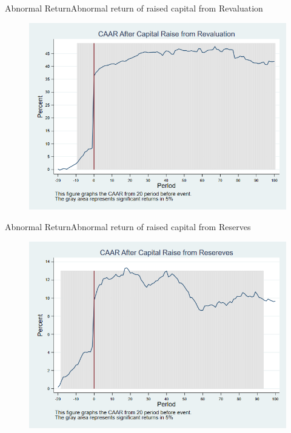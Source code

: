 \documentclass{beamer}
\begin{document}
\begin{frame}{Abnormal Return}{Abnormal return of raised capital from Revaluation}
	\label{abreturnrevalutionWithoutAlpha}
	\begin{figure}
		\centering
		\includegraphics[width=0.65\linewidth]{AbReturnRevalution_WithoutAlpha}
		\label{fig:abreturnrevalution3}
	\end{figure}
	
	\hfill\hyperlink{abreturnrevalution}{}
\end{frame}


\begin{frame}{Abnormal Return}{Abnormal return of raised capital from Reserves}
	\label{abreturnsavingWithoutAlpha}
	\begin{figure}
		\centering
		\includegraphics[width=0.65\linewidth]{AbReturnSaving_WithoutAlpha}
		\label{fig:abreturnsaving3}
	\end{figure}
	
	\hfill\hyperlink{abreturnsaving}{}
\end{frame}
\end{document}
